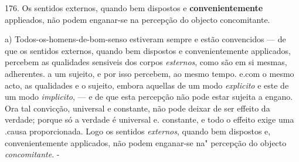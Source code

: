 176. Os sentidos externos, quando bem dispostos e \textbf{convenientemente} applieados, não podem enganar-se na percepção do objecto concomitante.

a) Todos-os-homens-de-bom-senso estiveram sempre e estão convencidos --- de que os sentidos externos, quando bem dispostos e convenientemente applicados, percebem as qualidades sensiveis dos corpos \emph{esternos}, como são em si mesmas, adherentes. a um sujeito, e por isso percebem, ao mesmo tempo. e.com o mesmo acto, as qualidades e o sujeito, embora aquellas de um modo \emph{explicito} e este de um modo \emph{implicito}, --- e de que esta percepção não pode estar sujeita a engano. Ora tal convicção, universal e constante, não pode deixar de ser effeito da verdade; porque só a verdade é universal e. constante, e todo o effeito exige uma .causa proporcionada. Logo os sentidos \emph{externos}, quando bem dispostos e, convenientemente applicados, não podem enganar-se na" percepção do objecto \emph{concomitante}. -

